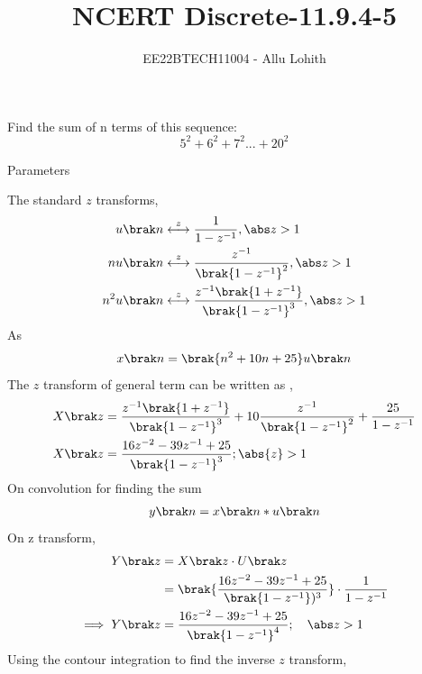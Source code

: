 \documentclass[journal,12pt,twocolumn]{IEEEtran}
\theoremstyle{remark}
\begin{document}

\vspace{3cm}

\title{NCERT Discrete-11.9.4-5}
\author{EE22BTECH11004 - Allu Lohith}

\maketitle
\newpage
\bigskip


 Find the sum of n terms of this sequence:$$5^2+6^2+7^2...+20^2$$  
\solution

\fi

\begin{table}[h!]
\centering

\vspace{0.5cm}
\caption{\normalsize Parameters}
\end{table}
The standard $z$ transforms,
\begin{align}
    u \brak n &\stackrel{z}{\longleftrightarrow} \frac{1}{1-z^{-1}}, \abs z >1\\
   n u\brak n &\stackrel{z}{\longleftrightarrow} \frac{z^{-1}}{\brak{1-z^{-1}}^2}, \abs z >1\\
   n^2 u\brak n &\stackrel{z}{\longleftrightarrow} \frac{z^{-1}\brak{1+z^{-1}}}{\brak{1-z^{-1}}^3}, \abs z >1
\end{align}
As 
\begin{align}
    x\brak n = \brak{n^2+10n+25}u\brak n
\end{align}
The $z$ transform of general term can be written as , 
\begin{align}
    X\brak z &= \frac{z^{-1}\brak{1+z^{-1}}}{\brak{1-z^{-1}}^3}+10\frac{z^{-1}}{\brak{1-z^{-1}}^2}+\frac{25}{1-z^{-1}} \\
    X\brak z &=  \frac{16z^{-2}-39z^{-1}+25}{\brak{1-z^{-1}}^3}; \abs{z}>1
\end{align}
On convolution for finding the sum
\begin{align}
    y\brak n= x\brak n \ast u\brak n
\end{align}
On z transform,
\begin{align}
    Y\brak z &= X \brak z \cdot U \brak z\\
    &= \brak{\frac{16z^{-2}-39z^{-1}+25}{\brak{1-z^{-1}})^3}} \cdot \frac{1}{1-z^{-1}}\\
    \implies 
    Y \brak z & = \frac{16z^{-2}-39z^{-1}+25}{\brak{1-z^{-1}}^4}; \quad \abs z >1
\end{align}
Using the contour integration to find the inverse $z$ transform,
\end{document}
